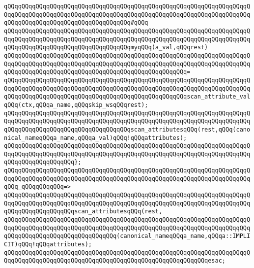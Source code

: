 \verb|qQQqqQQqqQQqqQQqqQQqqQQqqQQqqQQqqQQqqQQqqQQqqQQqqQQqqQQqqQQqqQQqqQQqqQQqqQQqqQQqqQQqqQQqqQQqqQQqqQQqqQQqqQQqqQQqqQQqqQQqqQQqqQQqqQQqqQQqqQQqqQQqqQQqqQQqqQQqqQQqqQQqqQQqqQQqqQQq#qQQq|\newline
\verb|qQQqqQQqqQQqqQQqqQQqqQQqqQQqqQQqqQQqqQQqqQQqqQQqqQQqqQQqqQQqqQQqqQQqqQQqqQQqqQQqqQQqqQQqqQQqqQQqqQQqqQQqqQQqqQQqqQQqqQQqqQQqqQQqqQQqqQQqqQQqqQQqqQQqqQQqqQQqqQQqqQQqqQQqqQQqqQQqmyqQQq(a_val,qQQqrest)|\newline
\verb|qQQqqQQqqQQqqQQqqQQqqQQqqQQqqQQqqQQqqQQqqQQqqQQqqQQqqQQqqQQqqQQqqQQqqQQqqQQqqQQqqQQqqQQqqQQqqQQqqQQqqQQqqQQqqQQqqQQqqQQqqQQqqQQqqQQqqQQqqQQqqQQqqQQqqQQqqQQqqQQqqQQqqQQqqQQqqQQqqQQqqQQqqQQqqQQq=|\newline
\verb|qQQqqQQqqQQqqQQqqQQqqQQqqQQqqQQqqQQqqQQqqQQqqQQqqQQqqQQqqQQqqQQqqQQqqQQqqQQqqQQqqQQqqQQqqQQqqQQqqQQqqQQqqQQqqQQqqQQqqQQqqQQqqQQqqQQqqQQqqQQqqQQqqQQqqQQqqQQqqQQqqQQqqQQqqQQqqQQqqQQqqQQqqQQqqQQqscan_attribute_valqQQq(ctx,qQQqa_name,qQQqskip_wsqQQqrest);|\newline
\newline
\verb|qQQqqQQqqQQqqQQqqQQqqQQqqQQqqQQqqQQqqQQqqQQqqQQqqQQqqQQqqQQqqQQqqQQqqQQqqQQqqQQqqQQqqQQqqQQqqQQqqQQqqQQqqQQqqQQqqQQqqQQqqQQqqQQqqQQqqQQqqQQqqQQqqQQqqQQqqQQqqQQqqQQqqQQqqQQqqQQqscan_attributesqQQq(rest,qQQq(canonical_nameqQQqa_name,qQQqa_val)qQQq!qQQqattributes);|\newline
\verb|qQQqqQQqqQQqqQQqqQQqqQQqqQQqqQQqqQQqqQQqqQQqqQQqqQQqqQQqqQQqqQQqqQQqqQQqqQQqqQQqqQQqqQQqqQQqqQQqqQQqqQQqqQQqqQQqqQQqqQQqqQQqqQQqqQQqqQQqqQQqqQQqqQQqqQQqqQQqqQQq};|\newline
\newline
\verb|qQQqqQQqqQQqqQQqqQQqqQQqqQQqqQQqqQQqqQQqqQQqqQQqqQQqqQQqqQQqqQQqqQQqqQQqqQQqqQQqqQQqqQQqqQQqqQQqqQQqqQQqqQQqqQQqqQQqqQQqqQQqqQQqqQQqqQQqqQQqqQQq_qQQqqQQqqQQq=>|\newline
\verb|qQQqqQQqqQQqqQQqqQQqqQQqqQQqqQQqqQQqqQQqqQQqqQQqqQQqqQQqqQQqqQQqqQQqqQQqqQQqqQQqqQQqqQQqqQQqqQQqqQQqqQQqqQQqqQQqqQQqqQQqqQQqqQQqqQQqqQQqqQQqqQQqqQQqqQQqqQQqqQQqscan_attributesqQQq(rest,|\newline
\verb|qQQqqQQqqQQqqQQqqQQqqQQqqQQqqQQqqQQqqQQqqQQqqQQqqQQqqQQqqQQqqQQqqQQqqQQqqQQqqQQqqQQqqQQqqQQqqQQqqQQqqQQqqQQqqQQqqQQqqQQqqQQqqQQqqQQqqQQqqQQqqQQqqQQqqQQqqQQqqQQqqQQqqQQqqQQq(canonical_nameqQQqa_name,qQQqa::IMPLICIT)qQQq!qQQqattributes);|\newline
\verb|qQQqqQQqqQQqqQQqqQQqqQQqqQQqqQQqqQQqqQQqqQQqqQQqqQQqqQQqqQQqqQQqqQQqqQQqqQQqqQQqqQQqqQQqqQQqqQQqqQQqqQQqqQQqqQQqqQQqqQQqqQQqqQQqesac;|\newline
